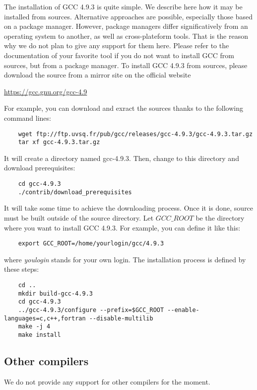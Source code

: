 The installation of GCC 4.9.3 is quite simple. We describe here how it may be installed from sources. Alternative approaches are possible, especially those based on a package manager. However, package managers differ significatively from an operating system to another, as well as cross-plateform tools. That is the reason why we do not plan to give any support for them here. Please refer to the documentation of your favorite tool if you do not want to install GCC from sources, but from a package manager. To install GCC 4.9.3 from sources, please download the source from a mirror site on the official website 
\begin{center}
	\url{https://gcc.gnu.org/gcc-4.9}
\end{center}
For example, you can download and exract the sources thanks to the following command lines:
\begin{verbatim}
	wget ftp://ftp.uvsq.fr/pub/gcc/releases/gcc-4.9.3/gcc-4.9.3.tar.gz
	tar xf gcc-4.9.3.tar.gz
\end{verbatim}
It will create a directory named gcc-4.9.3. Then, change to this directory and download prerequisites:
\begin{verbatim}
	cd gcc-4.9.3
	./contrib/download_prerequisites
\end{verbatim}
It will take some time to achieve the downloading process. Once it is done, source must be built outside of the source directory. Let $GCC\_ROOT$ be the directory where you want to install GCC 4.9.3. For example, you can define it like this:
\begin{verbatim}
	export GCC_ROOT=/home/yourlogin/gcc/4.9.3
\end{verbatim}
where \textit{youlogin} stands for your own login. The installation process is defined by these steps:
\begin{verbatim}
	cd ..
	mkdir build-gcc-4.9.3
	cd gcc-4.9.3
	../gcc-4.9.3/configure --prefix=$GCC_ROOT --enable-languages=c,c++,fortran --disable-multilib
	make -j 4
	make install
\end{verbatim}




\subsection{Other compilers}

We do not provide any support for other compilers for the moment.